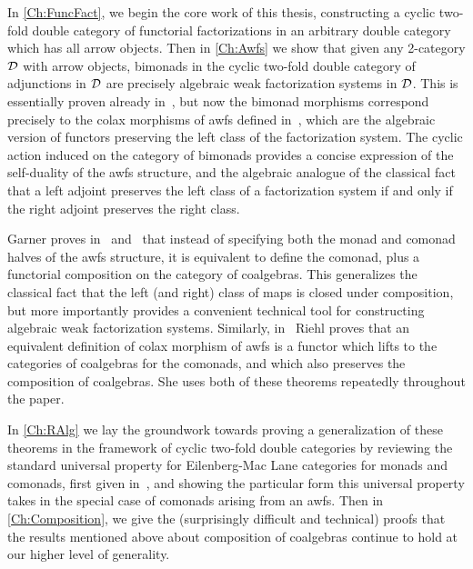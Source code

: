 In \cref{Ch:FuncFact}, we begin the core work of this thesis, constructing a cyclic two-fold double category of functorial factorizations in an arbitrary double category which has all arrow objects. Then in \cref{Ch:Awfs} we show that given any 2-category $\mathcal{D}$ with arrow objects, bimonads in the cyclic two-fold double category of adjunctions in $\mathcal{D}$ are precisely algebraic weak factorization systems in $\mathcal{D}$. This is essentially proven already in~\cite{garner:nwfs}, but now the bimonad morphisms correspond precisely to the colax morphisms of awfs defined in~\cite{riehl:nwfs-model}, which are the algebraic version of functors preserving the left class of the factorization system. The cyclic action induced on the category of bimonads provides a concise expression of the self-duality of the awfs structure, and the algebraic analogue of the classical fact that a left adjoint preserves the left class of a factorization system if and only if the right adjoint preserves the right class.

Garner proves in~\cite{garner:nwfs} and~\cite{garner:soa} that instead of specifying both the monad and comonad halves of the awfs structure, it is equivalent to define the comonad, plus a functorial composition on the category of coalgebras. This generalizes the classical fact that the left (and right) class of maps is closed under composition, but more importantly provides a convenient technical tool for constructing algebraic weak factorization systems. Similarly, in~\cite{riehl:nwfs-model} Riehl proves that an equivalent definition of colax morphism of awfs is a functor which lifts to the categories of coalgebras for the comonads, and which also preserves the composition of coalgebras. She uses both of these theorems repeatedly throughout the paper.

In \cref{Ch:RAlg} we lay the groundwork towards proving a generalization of these theorems in the framework of cyclic two-fold double categories by reviewing the standard universal property for Eilenberg-Mac Lane categories for monads and comonads, first given in~\cite{street:ftm}, and showing the particular form this universal property takes in the special case of comonads arising from an awfs. Then in \cref{Ch:Composition}, we give the (surprisingly difficult and technical) proofs that the results mentioned above about composition of coalgebras continue to hold at our higher level of generality.

